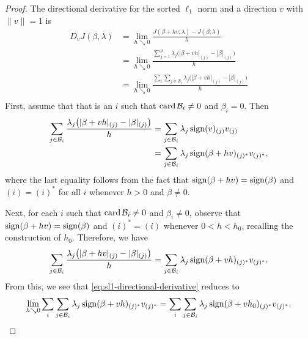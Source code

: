 \begin{proof}
  The directional derivative for the sorted \(\ell_1\) norm and a direction
  \(v\) with \(\lVert v \rVert = 1\) is
  \begin{equation}
    \label{eq:sl1-directional-derivative}
    \begin{aligned}
      D_v J(\beta, \lambda) & = \lim_{h \searrow 0} \frac{J(\beta + h v; \lambda) - J(\beta; \lambda)}{h}                                            \\
                            & = \lim_{h \searrow 0} \frac{\sum_{j=1}^p\lambda_j\big(|\beta + vh|_{(j)} - |\beta|_{(j)}\big)}{h}                      \\
                            & = \lim_{h \searrow 0}\frac{\sum_i \sum_{j \in \mathcal{B}_i} \lambda_j\big(|\beta + vh|_{(j)} - |\beta|_{(j)}\big)}{h} \\
    \end{aligned}
  \end{equation}
  First, assume that that is an \(i\) such that \(\operatorname{card} \mathcal{B}_i \neq 0\)
  and \(\beta_i = 0\).
  Then
  \[
    \begin{aligned}
      \sum_{j \in \mathcal{B}_i}\frac{\lambda_j \big( |\beta + vh|_{(j)} - |\beta|_{(j)}\big)}{h}
       & = \sum_{j \in \mathcal{B}_i} \lambda_j \operatorname{sign}(v)_{(j)}v_{(j)}               \\
       & = \sum_{j \in \mathcal{B}_i} \lambda_j \operatorname{sign}(\beta + hv)_{(j)^*}v_{(j)^*},
    \end{aligned}
  \]
  where the last equality follows from the fact that \(\operatorname{sign}(\beta + hv) =
  \operatorname{sign}(\beta)\) and \((i) = (i)^*\) for all \(i\) whenever \(h > 0\) and
  \(\beta \neq 0\).

  Next, for each \(i\) such that \(\operatorname{card} \mathcal{B}_i \neq 0\) and
  \(\beta_i \neq 0\), observe that \(\operatorname{sign}(\beta + hv) = \operatorname{sign}(\beta)\) and
  \((i)^* = (i)\) whenever \(0 < h < h_0\), recalling the construction
  of \(h_0\).
  Therefore, we have
  \[
    \sum_{j \in \mathcal{B}_i} \frac{\lambda_j\big(|\beta + hv|_{(j)} - |\beta|_{(j)}\big)}{h}
    = \sum_{j \in \mathcal{B}_i} \lambda_j\operatorname{sign}(\beta + vh)_{(j)^*}v_{(j)^*}.
  \]
  From this, we see that \eqref{eq:sl1-directional-derivative} reduces to
  \[
    \lim_{h \searrow 0} \sum_i \sum_{j \in \mathcal{B}_i} \lambda_j\operatorname{sign}(\beta + vh)_{(j)^*}v_{(j)^*}
    = \sum_i \sum_{j \in \mathcal{B}_i} \lambda_j\operatorname{sign}(\beta + vh_0)_{(j)^*}v_{(j)^*}.
  \]

\end{proof}
